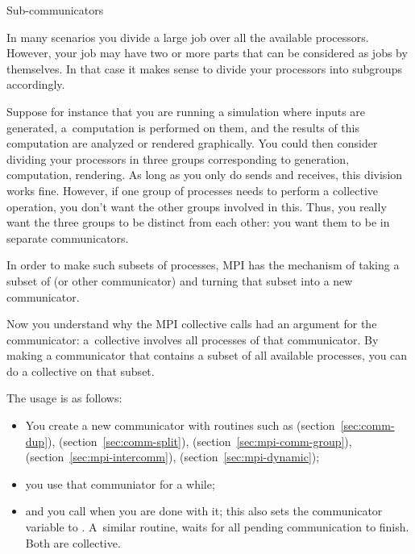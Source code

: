  {Sub-communicators}
\label{sec:communicators}

In many scenarios you divide a large job over all the available processors.
However, your job may have two or more parts that can be considered as
jobs by themselves. In that case it makes sense to divide your processors
into subgroups accordingly.

Suppose for instance that you are running a simulation where inputs are generated,
a~computation is performed on them, and the results of this computation
are analyzed or rendered graphically. You could then consider dividing your
processors in three groups corresponding to generation, computation, rendering.
%
As long as you only do sends and receives, this division works fine. However,
if one group of processes needs to perform a collective operation, you don't
want the other groups involved in this. Thus, you really want the three groups
to be distinct from each other:
you want them to be in separate communicators.

In order to make such subsets of processes, MPI has the mechanism of
taking a subset of 
(or other communicator)
and turning that subset into a new communicator.

Now you understand why the MPI collective calls had an argument for the
communicator: a~collective involves all processes of that communicator.
By making a communicator that contains a subset of all available processes,
you can do a collective on that subset.

The usage is as follows:
\begin{itemize}
\item You create a new communicator with routines such as
   (section~\ref{sec:comm-dup}),
   (section~\ref{sec:comm-split}),
   (section~\ref{sec:mpi-comm-group}),
   (section~\ref{sec:mpi-intercomm}),
   (section~\ref{sec:mpi-dynamic});
\item you use that communiator for a while;
\item and you call  when you are done with it;
  this also sets the communicator variable to .
  A~similar routine,  waits for all pending
  communication to finish. Both are collective.
\end{itemize}

